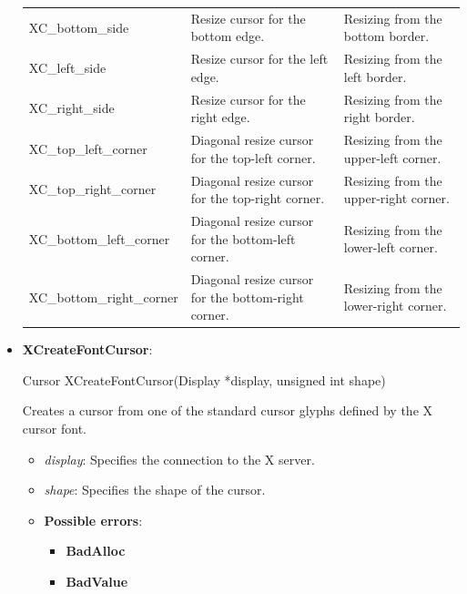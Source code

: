 \documentclass{report}
\begin{document}
\begin{itemize}
\begin{center}
\begin{tabularx}{\textwidth}{@{}lXX@{}}
                    XC\_bottom\_side	&Resize cursor for the bottom edge.	&Resizing from the bottom border.\\[2ex]
                    XC\_left\_side	&Resize cursor for the left edge.	&Resizing from the left border.\\[2ex]
                    XC\_right\_side	&Resize cursor for the right edge.	&Resizing from the right border.\\[2ex]
                    XC\_top\_left\_corner&	Diagonal resize cursor for the top-left corner.	&Resizing from the upper-left corner.\\[2ex]
                    XC\_top\_right\_corner&	Diagonal resize cursor for the top-right corner.	&Resizing from the upper-right corner.\\[2ex]
                    XC\_bottom\_left\_corner&	Diagonal resize cursor for the bottom-left corner.	&Resizing from the lower-left corner.\\[2ex]
                    XC\_bottom\_right\_corner&	Diagonal resize cursor for the bottom-right corner.	&Resizing from the lower-right corner. \\
                    \bottomrule
                \end{tabularx}
            \end{center}
        \item \textbf{XCreateFontCursor}:
            \bigbreak \noindent 
            \begin{cppcode}
                Cursor XCreateFontCursor(Display *display, unsigned int shape)
            \end{cppcode}
            \bigbreak \noindent
            Creates a cursor from one of the standard cursor glyphs defined by the X cursor font.
            \begin{itemize}
                \item \textit{display}: Specifies the connection to the X server.
                \item \textit{shape}: Specifies the shape of the cursor.
            \end{itemize}
            \begin{itemize}
                \item \textbf{Possible errors}:
                    \begin{itemize}
                        \item \textbf{BadAlloc}
                        \item \textbf{BadValue}
                    \end{itemize}
            \end{itemize}



\end{itemize}
\end{document}
